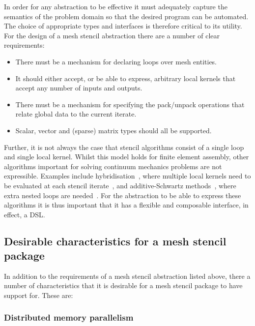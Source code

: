 \documentclass[thesis]{subfiles}
\begin{document}
In order for any abstraction to be effective it must adequately capture the semantics of the problem domain so that the desired program can be automated.
The choice of appropriate types and interfaces is therefore critical to its utility.
For the design of a mesh stencil abstraction there are a number of clear requirements:
\begin{itemize}
  \item There must be a mechanism for declaring loops over mesh entities.
  \item It should either accept, or be able to express, arbitrary local kernels that accept any number of inputs and outputs.
  \item There must be a mechanism for specifying the pack/unpack operations that relate global data to the current iterate.
  \item Scalar, vector and (sparse) matrix types should all be supported.
\end{itemize}

Further, it is not always the case that stencil algorithms consist of a single loop and single local kernel.
Whilst this model holds for finite element assembly, other algorithms important for solving continuum mechanics problems are not expressible.
Examples include hybridisation~\cite{arnoldMixedNonconformingFinite1985,boffi2013mixed}, where multiple local kernels need to be evaluated at each stencil iterate~\cite{gibsonSlateExtendingFiredrake2020}, and additive-Schwartz methods~\cite{arnoldPreconditioningHdivApplications1997}, where extra nested loops are needed~\cite{farrellPCPATCHSoftwareTopological2021}.
For the abstraction to be able to express these algorithms it is thus important that it has a flexible and composable interface, in effect, a DSL.

\subsection{Desirable characteristics for a mesh stencil package}
\label{sec:intro_desirable_traits}

In addition to the requirements of a mesh stencil abstraction listed above, there a number of characteristics that it is desirable for a mesh stencil package to have support for.
These are:

\subsubsection{Distributed memory parallelism}
\label{sec:intro_parallelism}
\end{document}

